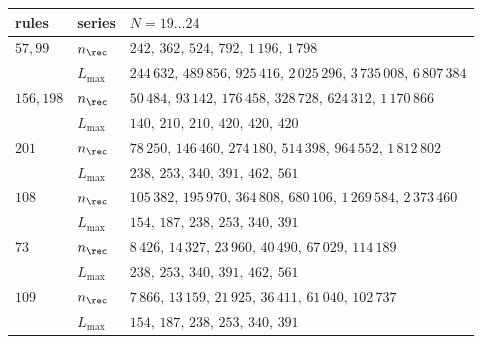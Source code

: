 \begin{tabular}{lll}
\hline
rules & series & $N=19\ldots24$ \\
\hline
$57, 99$ & $n_\rec$ & $242,\,362,\,524,\,792,\,1\,196,\,1\,798$ \\
 & $L_{\max}$ & $244\,632,\,489\,856,\,925\,416,\,2\,025\,296,\,3\,735\,008,\,6\,807\,384$ \\[2pt]
$156, 198$ & $n_\rec$ & $50\,484,\,93\,142,\,176\,458,\,328\,728,\,624\,312,\,1\,170\,866$ \\
 & $L_{\max}$ & $140,\,210,\,210,\,420,\,420,\,420$ \\[2pt]
$201$ & $n_\rec$ & $78\,250,\,146\,460,\,274\,180,\,514\,398,\,964\,552,\,1\,812\,802$ \\
 & $L_{\max}$ & $238,\,253,\,340,\,391,\,462,\,561$ \\[2pt]
$108$ & $n_\rec$ & $105\,382,\,195\,970,\,364\,808,\,680\,106,\,1\,269\,584,\,2\,373\,460$ \\
 & $L_{\max}$ & $154,\,187,\,238,\,253,\,340,\,391$ \\[2pt]
$73$ & $n_\rec$ & $8\,426,\,14\,327,\,23\,960,\,40\,490,\,67\,029,\,114\,189$ \\
 & $L_{\max}$ & $238,\,253,\,340,\,391,\,462,\,561$ \\[2pt]
$109$ & $n_\rec$ & $7\,866,\,13\,159,\,21\,925,\,36\,411,\,61\,040,\,102\,737$ \\
 & $L_{\max}$ & $154,\,187,\,238,\,253,\,340,\,391$ \\[2pt]
\hline
\end{tabular}
